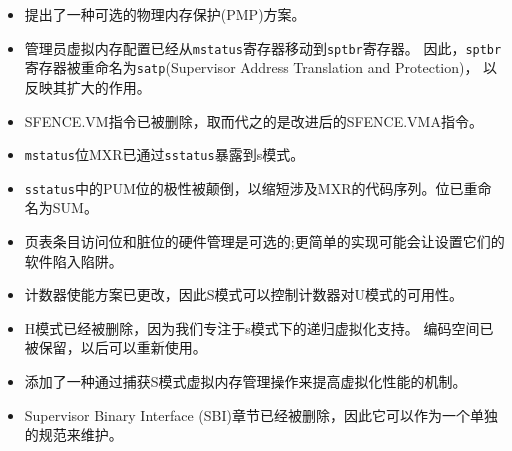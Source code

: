 \begin{itemize}
\item 提出了一种可选的物理内存保护(PMP)方案。
\item 管理员虚拟内存配置已经从{\tt mstatus}寄存器移动到{\tt sptbr}寄存器。
因此，{\tt sptbr}寄存器被重命名为{\tt satp}(Supervisor Address Translation and Protection)，
以反映其扩大的作用。
\item SFENCE.VM指令已被删除，取而代之的是改进后的SFENCE.VMA指令。
\item {\tt mstatus}位MXR已通过{\tt sstatus}暴露到s模式。
\item {\tt sstatus}中的PUM位的极性被颠倒，以缩短涉及MXR的代码序列。位已重命名为SUM。
\item 页表条目访问位和脏位的硬件管理是可选的;更简单的实现可能会让设置它们的软件陷入陷阱。
\item 计数器使能方案已更改，因此S模式可以控制计数器对U模式的可用性。
\item H模式已经被删除，因为我们专注于s模式下的递归虚拟化支持。
      编码空间已被保留，以后可以重新使用。
\item 添加了一种通过捕获S模式虚拟内存管理操作来提高虚拟化性能的机制。
\item Supervisor Binary Interface (SBI)章节已经被删除，因此它可以作为一个单独的规范来维护。
\end{itemize}


